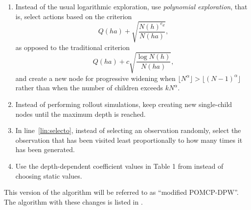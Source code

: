\begin{enumerate}
    \item Instead of the usual logarithmic exploration, use \emph{polynomial exploration}, that is, select actions based on the criterion
    \begin{equation}
        Q(ha) + \sqrt{\frac{N(h)^{e_d}}{N(ha)}}\text{,}
    \end{equation}
    as opposed to the traditional criterion
    \begin{equation}
        Q(ha) + c \sqrt{\frac{\log N(h)}{N(ha)}}\text{,}
    \end{equation}
    and create a new node for progressive widening when $\lfloor N^\alpha \rfloor > \lfloor (N-1)^\alpha \rfloor$ rather than when the number of children exceeds $k N^\alpha$.

    \item Instead of performing rollout simulations, keep creating new single-child nodes until the maximum depth is reached.

    \item In line~\ref{lin:selecto}, instead of selecting an observation randomly, select the observation that has been visited least proportionally to how many times it has been generated.

    \item Use the depth-dependent coefficient values in Table 1 from \citet{auger2013continuous} instead of choosing static values.
\end{enumerate}

This version of the algorithm will be referred to as ``modified POMCP-DPW''. The algorithm with these changes is listed in .

